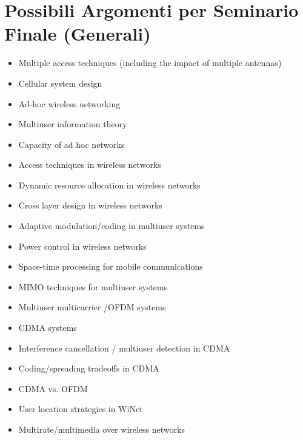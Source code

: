 \documentclass{article}
\begin{document}
\section*{Possibili Argomenti per Seminario Finale (Generali)}
\begin{itemize}
    \item Multiple access techniques (including the impact of multiple antennas)
    \item Cellular system design
    \item Ad-hoc wireless networking
    \item Multiuser information theory
    \item Capacity of ad hoc networks
    \item Access techniques in wireless networks
    \item Dynamic resource allocation in wireless networks
    \item Cross layer design in wireless networks
    \item Adaptive modulation/coding in multiuser systems
    \item Power control in wireless networks
    \item Space-time processing for mobile communications
    \item MIMO techniques for multiuser systems
    \item Multiuser multicarrier /OFDM systems
    \item CDMA systems
    \item Interference cancellation / multiuser detection in CDMA
    \item Coding/spreading tradeoffs in CDMA
    \item CDMA vs. OFDM
    \item User location strategies in WiNet
    \item Multirate/multimedia over wireless networks
\end{itemize}
\end{document}
